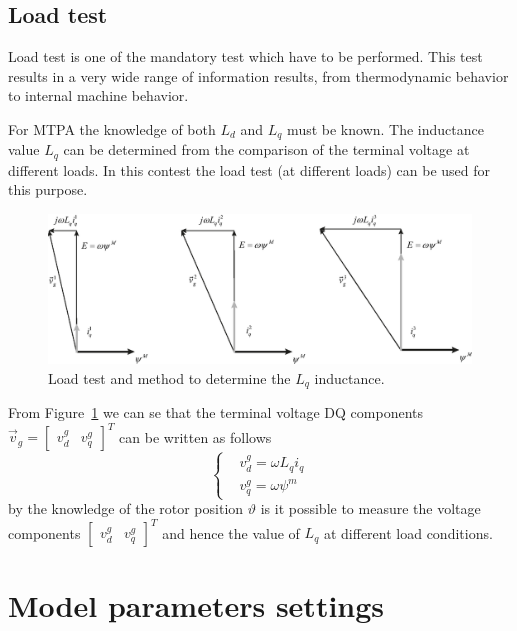 \documentclass[11pt,a4paper]{article}
\numberwithin{equation}{section}
\theoremstyle{it}
\theoremstyle{definition}
\begin{document}
\begin{onehalfspace}
\subsection{Load test}
Load test is one of the mandatory test which have to be performed. This test results in a very wide range of information results, from thermodynamic behavior to internal machine behavior. 

For MTPA the knowledge of both $L_d$ and $L_q$ must be known. The inductance value $L_q$ can be determined from the comparison of the terminal voltage at different loads. In this contest the load test (at different loads) can be used for this purpose.
\begin{figure}[H]
	\centering
	\includegraphics[width = 400pt, keepaspectratio]{figures/pmsm/load_test_Lq.eps}
	\captionsetup{width=0.5\textwidth, font=small}
	\caption{Load test and method to determine the $L_q$ inductance.}
	\label{load_test_Lq}
\end{figure}
From Figure~\ref{load_test_Lq} we can se that the terminal voltage DQ components $\vec{v}_{g}=\begin{bmatrix} v_d^g &  v_q^g \end{bmatrix}^T$ can be written as follows
\begin{equation}
	\left\lbrace \begin{aligned}
	&	v_d^g = \omega L_q i_q \\[6pt]
	&	v_q^g = \omega \psi^m
	\end{aligned}\right. 
\end{equation}
by the knowledge of the rotor position $\vartheta$ is it possible to measure the voltage components $\begin{bmatrix} v_d^g &  v_q^g \end{bmatrix}^T$ and hence the value of $L_q$ at different load conditions.

\section{Model parameters settings}


\end{onehalfspace}
\end{document}
